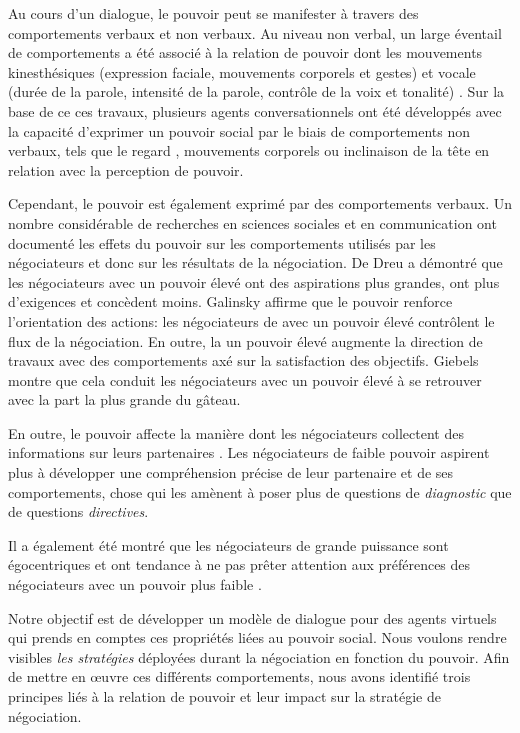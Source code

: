 \documentclass [french]{sig-alternate-05-2015}
\begin{document}
		Au cours d'un dialogue, le pouvoir peut se manifester à travers des comportements verbaux et non verbaux.
		Au niveau non verbal, un large éventail de comportements a été associé à la relation de pouvoir dont les mouvements kinesthésiques (expression faciale, mouvements corporels et gestes) et vocale (durée de la parole, intensité de la parole, contrôle de la voix et tonalité) \cite {burgoonnonverbal}. Sur la base de ce ces travaux, plusieurs agents conversationnels ont été développés avec la capacité d'exprimer un pouvoir social par le biais de comportements non verbaux, tels que le regard \cite {lance2008relation}, mouvements corporels \cite {mignault2003many} ou inclinaison de la tête  \cite {gebhard2014exploring} en relation avec la perception de pouvoir.
	
	
		Cependant, le pouvoir est également exprimé par des comportements verbaux. Un nombre considérable de recherches en sciences sociales et en communication ont documenté les effets du pouvoir sur les comportements utilisés par les négociateurs et donc sur les résultats de la négociation. De Dreu \cite {de1995impact} a démontré que les négociateurs avec un pouvoir élevé ont des aspirations plus grandes, ont plus d'exigences et concèdent moins. Galinsky \cite{galinsky2003power} affirme que le pouvoir renforce l'orientation des actions: les négociateurs de avec un pouvoir élevé contrôlent le flux de la négociation. En outre, la un pouvoir élevé augmente la direction de travaux avec des comportements axé sur la satisfaction des objectifs. Giebels \cite {giebels2000interdependence} montre que cela conduit les négociateurs avec un pouvoir élevé à se retrouver avec la part la plus grande du gâteau.
		
		En outre, le pouvoir affecte la manière dont les négociateurs collectent des informations sur leurs partenaires \cite {de2004influence}. Les négociateurs de faible pouvoir aspirent plus à développer une compréhension précise de leur partenaire et de ses comportements, chose qui les amènent à poser plus de questions  de \emph {diagnostic} que de questions \emph{directives}.
		
		Il a également été montré que les négociateurs de grande puissance sont égocentriques et ont tendance à ne pas prêter attention aux préférences des négociateurs avec un pouvoir plus faible \cite{fiske1993controlling, de1995impact}.
		
		Notre objectif est de développer un modèle de dialogue pour des agents virtuels qui prends en comptes ces propriétés liées au pouvoir social. Nous voulons rendre visibles \emph {les stratégies} déployées durant la négociation en fonction du pouvoir. Afin de mettre en œuvre ces différents comportements, nous avons identifié trois principes liés à la relation de pouvoir et leur impact sur la stratégie de négociation.
		
\end{document}
